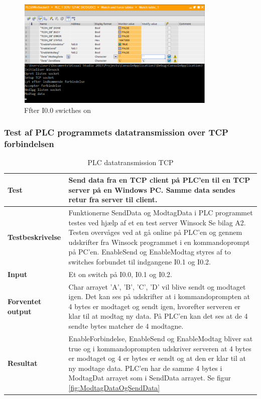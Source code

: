 \begin{figure}[H] %
	\centering
	\includegraphics[width=0.85\textwidth]{Test/ModultestStyringsenhed/OpretForbindelseEfter}
	\caption{Ffter I0.0 swicthes on}
	\label{fig:OpretForbindelseEfter}
\end{figure}

\subsubsection{Test af PLC programmets datatransmission over TCP forbindelsen}

\begin{table}[H]
	\centering
	\begin{tabular}{ | m{} | m{}|} 
		\hline
		\textbf{Test}					&Send data fra en TCP client på PLC'en til en TCP server på en Windows PC. Samme data sendes retur fra server til client. \\ \hline
		\textbf{Testbeskrivelse}		&Funktionerne SendData og ModtagData i PLC programmet testes ved hjælp af et en test server Winsock Se bilag A2. Testen overvåges ved at gå online på PLC'en og gennem udskrifter fra Winsock programmet i en kommandoprompt på PC'en. EnableSend og EnableModtag styres af to switches forbundet til indgangene I0.1 og I0.2. \\ \hline
		\textbf{Input}					& Et on switch på I0.0, I0.1 og I0.2.\\ \hline
		\textbf{Forventet output}		&Char arrayet 'A', 'B', 'C', 'D' vil blive sendt og modtaget igen. Det kan ses på udskrifter at i kommandoprompten at 4 bytes er modtaget og sendt igen, hvorefter serveren er klar til at modtag ny data. På PLC'en kan det ses at de 4 sendte bytes matcher de 4 modtagne.\\ \hline
		\textbf{Resultat}				&EnableForbindelse, EnableSend og EnableModtag bliver sat true og i kommandoprompten udskriver serveren at 4 bytes er modtaget og 4 er bytes er sendt og at den er klar til at ny modtage data. PLC'en har de samme 4 bytes i ModtagDat arrayet som i SendData arrayet. Se figur \ref{fig:ModtagDataOgSendData} \\ \hline
	\end{tabular}
	\caption{PLC datatransmission TCP} 
	\label{tab:PLCTCP}
\end{table}


